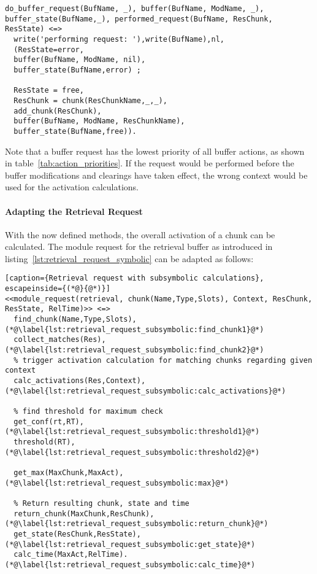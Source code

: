 \begin{lstlisting}[caption=Apply the results of the buffer request]
do_buffer_request(BufName, _), buffer(BufName, ModName, _), buffer_state(BufName,_), performed_request(BufName, ResChunk, ResState) <=>  
  write('performing request: '),write(BufName),nl,
  (ResState=error, 
  buffer(BufName, ModName, nil),
  buffer_state(BufName,error) ;  
  
  ResState = free,
  ResChunk = chunk(ResChunkName,_,_),
  add_chunk(ResChunk), 
  buffer(BufName, ModName, ResChunkName),
  buffer_state(BufName,free)).  
\end{lstlisting}

Note that a buffer request has the lowest priority of all buffer actions, as shown in table~\ref{tab:action_priorities}. If the request would be performed before the buffer modifications and clearings have taken effect, the wrong context would be used for the activation calculations.

\paragraph{Adapting the Retrieval Request}

With the now defined methods, the overall activation of a chunk can be calculated. The module request for the retrieval buffer as introduced in listing~\ref{lst:retrieval_request_symbolic} can be adapted as follows:

\begin{lstlisting}[caption={Retrieval request with subsymbolic calculations}, escapeinside={(*@}{@*)}]
<<module_request(retrieval, chunk(Name,Type,Slots), Context, ResChunk, ResState, RelTime)>> <=> 
  find_chunk(Name,Type,Slots), (*@\label{lst:retrieval_request_subsymbolic:find_chunk1}@*)
  collect_matches(Res), (*@\label{lst:retrieval_request_subsymbolic:find_chunk2}@*)
  % trigger activation calculation for matching chunks regarding given context
  calc_activations(Res,Context), (*@\label{lst:retrieval_request_subsymbolic:calc_activations}@*)
  
  % find threshold for maximum check
  get_conf(rt,RT), (*@\label{lst:retrieval_request_subsymbolic:threshold1}@*)
  threshold(RT), (*@\label{lst:retrieval_request_subsymbolic:threshold2}@*)
  
  get_max(MaxChunk,MaxAct), (*@\label{lst:retrieval_request_subsymbolic:max}@*)
  
  % Return resulting chunk, state and time
  return_chunk(MaxChunk,ResChunk), (*@\label{lst:retrieval_request_subsymbolic:return_chunk}@*)
  get_state(ResChunk,ResState), (*@\label{lst:retrieval_request_subsymbolic:get_state}@*)
  calc_time(MaxAct,RelTime). (*@\label{lst:retrieval_request_subsymbolic:calc_time}@*)
\end{lstlisting}

